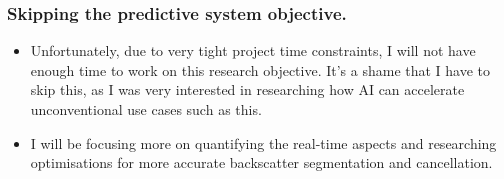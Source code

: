 \subsubsection{Skipping the predictive system objective.}

\begin{itemize}
    \item Unfortunately, due to very tight project time constraints, I will not have enough time to work on this research objective. It's a shame that I have to skip this, as I was very interested in researching how AI can accelerate unconventional use cases such as this.
    \item I will be focusing more on quantifying the real-time aspects and researching optimisations for more accurate backscatter segmentation and cancellation.
\end{itemize}